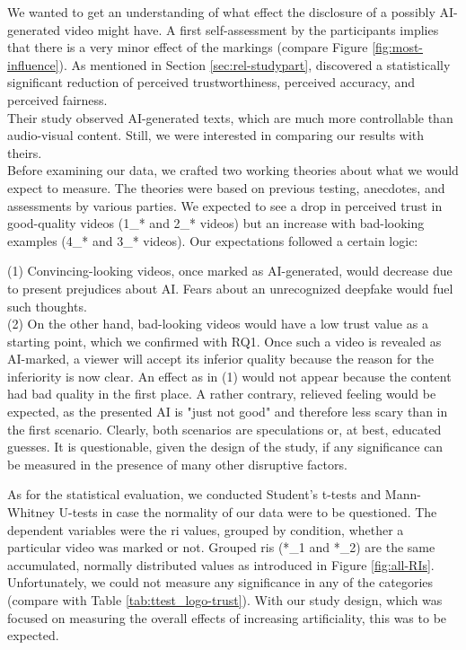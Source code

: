 \documentclass[
  a4paper,  %
  twoside,  %
  bibliography=totoc,
  headsepline,
  cleardoublepage=empty,
  parskip=half,
  draft=false
]{scrbook}
\begin{document}
We wanted to get an understanding of what effect the disclosure of a possibly AI-generated video might have. A first self-assessment by the participants implies that there is a very minor effect of the markings (compare Figure \ref{fig:most-influence}). As mentioned in Section \ref{sec:rel-studypart},  discovered a statistically significant reduction of perceived trustworthiness, perceived accuracy, and perceived fairness. \\
Their study observed AI-generated texts, which are much more controllable than audio-visual content. Still, we were interested in comparing our results with theirs. \\
Before examining our data, we crafted two working theories about what we would expect to measure. The theories were based on previous testing, anecdotes, and assessments by various parties. We expected to see a drop in perceived trust in good-quality videos (1\_* and 2\_* videos) but an increase with bad-looking examples (4\_* and 3\_* videos). Our expectations followed a certain logic:

(1) Convincing-looking videos, once marked as AI-generated, would decrease due to present prejudices about AI. Fears about an unrecognized deepfake would fuel such thoughts. \\
(2) On the other hand, bad-looking videos would have a low trust value as a starting point, which we confirmed with RQ1. Once such a video is revealed as AI-marked, a viewer will accept its inferior quality because the reason for the inferiority is now clear. An effect as in (1) would not appear because the content had bad quality in the first place. A rather contrary, relieved feeling would be expected, as the presented AI is "just not good" and therefore less scary than in the first scenario. Clearly, both scenarios are speculations or, at best, educated guesses. It is questionable, given the design of the study, if any significance can be measured in the presence of many other disruptive factors.

As for the statistical evaluation, we conducted Student's t-tests and Mann-Whitney U-tests in case the normality of our data were to be questioned. The dependent variables were the \gls{ri} values, grouped by condition, whether a particular video was marked or not. Grouped \gls{ri}s (*\_1 and *\_2) are the same accumulated, normally distributed values as introduced in Figure \ref{fig:all-RIs}. Unfortunately, we could not measure any significance in any of the categories (compare with Table \ref{tab:ttest_logo-trust}). With our study design, which was focused on measuring the overall effects of increasing artificiality, this was to be expected.
\end{document}
